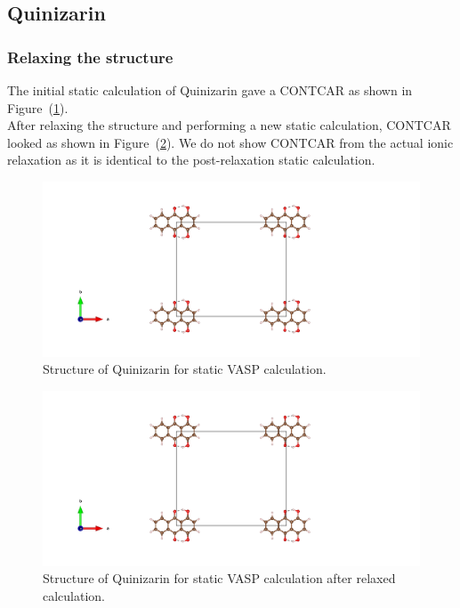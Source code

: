 \documentclass{article}
\begin{document}
    \vspace{1cm}

  \subsection{Quinizarin}

    \subsubsection{Relaxing the structure}

      The initial static calculation of Quinizarin gave a CONTCAR as shown in Figure~(\ref{fig:basic_staticbefore_CONTCAR}). \\

      After relaxing the structure and performing a new static calculation, CONTCAR looked as shown in Figure~(\ref{fig:basic_staticafter_CONTCAR}). We do not show CONTCAR from the actual ionic relaxation as it is identical to the post-relaxation static calculation. \\

      \begin{figure}[H]
        \centering
        \includegraphics[width = \textwidth]{../fig/basic_staticbefore_CONTCAR.png}
        \caption{Structure of Quinizarin for static VASP calculation. }
        \label{fig:basic_staticbefore_CONTCAR}
      \end{figure}

      \begin{figure}[H]
        \centering
        \includegraphics[width = \textwidth]{../fig/basic_staticafter_CONTCAR.png}
        \caption{Structure of Quinizarin for static VASP calculation after relaxed calculation. }
        \label{fig:basic_staticafter_CONTCAR}
      \end{figure}
\end{document}
